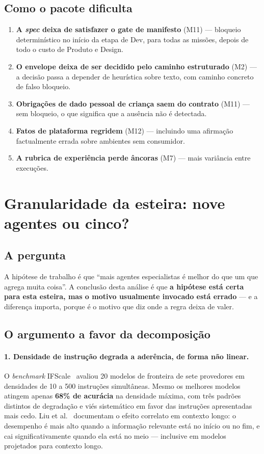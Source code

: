 \documentclass[11pt,a4paper]{article}
\begin{document}
\subsection{Como o pacote dificulta}

\begin{enumerate}[leftmargin=*,itemsep=2pt]
  \item \textbf{A \textit{spec} deixa de satisfazer o gate de manifesto} (M11) --- bloqueio determinístico
  no início da etapa de Dev, para todas as missões, depois de todo o custo de Produto e Design.
  \item \textbf{O envelope deixa de ser decidido pelo caminho estruturado} (M2) --- a decisão passa a
  depender de heurística sobre texto, com caminho concreto de falso bloqueio.
  \item \textbf{Obrigações de dado pessoal de criança saem do contrato} (M11) --- sem bloqueio, o que
  significa que a ausência não é detectada.
  \item \textbf{Fatos de plataforma regridem} (M12) --- incluindo uma afirmação factualmente errada sobre
  ambientes sem consumidor.
  \item \textbf{A rubrica de experiência perde âncoras} (M7) --- mais variância entre execuções.
\end{enumerate}

\newpage
\section{Granularidade da esteira: nove agentes ou cinco?}
\label{sec:granularidade}

\subsection{A pergunta}

A hipótese de trabalho é que ``mais agentes especialistas é melhor do que um que agrega muita coisa''.
A conclusão desta análise é que \textbf{a hipótese está certa para esta esteira, mas o motivo usualmente
invocado está errado} --- e a diferença importa, porque é o motivo que diz onde a regra deixa de valer.

\subsection{O argumento a favor da decomposição}

\paragraph{1. Densidade de instrução degrada a aderência, de forma não linear.}
O \textit{benchmark} IFScale~\cite{ifscale2025} avaliou 20 modelos de fronteira de sete provedores em
densidades de 10 a 500 instruções simultâneas. Mesmo os melhores modelos atingem apenas \textbf{68\% de
acurácia} na densidade máxima, com três padrões distintos de degradação e viés sistemático em favor das
instruções apresentadas mais cedo. Liu et al.~\cite{liu2024} documentam o efeito correlato em contexto
longo: o desempenho é mais alto quando a informação relevante está no início ou no fim, e cai
significativamente quando ela está no meio --- inclusive em modelos projetados para contexto longo.
\end{document}
